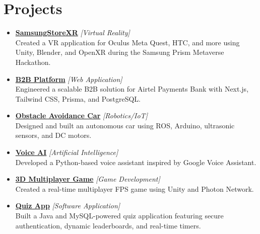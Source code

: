 \documentclass[a4paper,10pt]{article}
\newcommand{\sectionbreak}{\vspace{0.2em}}
\begin{document}
\section{Projects}
\begin{itemize}[noitemsep, topsep=0pt]
    \item \href{https://github.com/Shival-Gupta/SamsungStoreXR}{\textcolor{accentcolor}{\textbf{SamsungStoreXR}}} \textit{[Virtual Reality]} \\
    Created a VR application for Oculus Meta Quest, HTC, and more using Unity, Blender, and OpenXR during the Samsung Prism Metaverse Hackathon.
    
    \item \href{https://b2b-portal-rho.vercel.app/}{\textcolor{accentcolor}{\textbf{B2B Platform}}} \textit{[Web Application]} \\
    Engineered a scalable B2B solution for Airtel Payments Bank with Next.js, Tailwind CSS, Prisma, and PostgreSQL.
    
    \item \href{https://github.com/Shival-Gupta/obstacle-avoidance-car-ros-noetic}{\textcolor{accentcolor}{\textbf{Obstacle Avoidance Car}}} \textit{[Robotics/IoT]} \\
    Designed and built an autonomous car using ROS, Arduino, ultrasonic sensors, and DC motors.
    
    \item \href{https://github.com/Shival-Gupta/VoiceAI}{\textcolor{accentcolor}{\textbf{Voice AI}}} \textit{[Artificial Intelligence]} \\
    Developed a Python-based voice assistant inspired by Google Voice Assistant.
    
    \item \href{https://github.com/Shival-Gupta/WarGame}{\textcolor{accentcolor}{\textbf{3D Multiplayer Game}}} \textit{[Game Development]} \\
    Created a real-time multiplayer FPS game using Unity and Photon Network.
    
    \item \href{https://github.com/Shival-Gupta/QuizApp}{\textcolor{accentcolor}{\textbf{Quiz App}}} \textit{[Software Application]} \\
    Built a Java and MySQL-powered quiz application featuring secure authentication, dynamic leaderboards, and real-time timers.
\end{itemize}

\sectionbreak
\end{document}
